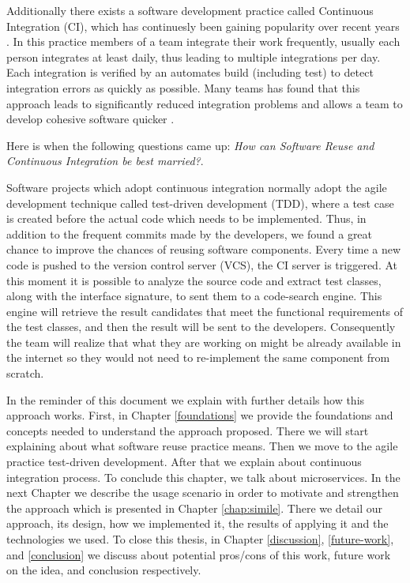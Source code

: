 Additionally there exists a software development practice called Continuous Integration (CI), which has continuesly been gaining popularity over recent years \cite{Perforce2015}. In this practice members of a team integrate their work frequently, usually each person integrates at least daily, thus leading to multiple integrations per day. Each integration is verified by an automates build (including test) to detect integration errors as quickly as possible. Many teams has found that this approach leads to significantly reduced integration problems and allows a team to develop cohesive software quicker \cite{Fowler2006}.

Here is when the following questions came up: \emph{How can Software Reuse and Continuous Integration be best married?}.

Software projects which adopt continuous integration normally adopt the agile development technique called test-driven development (TDD), where a test case is created before the actual code which needs to be implemented. Thus, in addition to the frequent commits made by the developers, we found a great chance to improve the chances of reusing software components. Every time a new code is pushed to the version control server (VCS), the CI server is triggered. At this moment it is possible to analyze the source code and extract test classes, along with the interface signature, to sent them to a code-search engine. This engine will retrieve the result candidates that meet the functional requirements of the test classes, and then the result will be sent to the developers. Consequently the team will realize that what they are working on might be already available in the internet so they would not need to re-implement the same component from scratch.

In the reminder of this document we explain with further details how this approach works. First, in Chapter \ref{foundations} we provide the foundations and concepts needed to understand the approach proposed. There we will start explaining about what software reuse practice means. Then we move to the agile practice test-driven development. After that we explain about continuous integration process. To conclude this chapter, we talk about microservices. In the next Chapter we describe the usage scenario in order to motivate and strengthen the approach which is presented in Chapter \ref{chap:simile}. There we detail our approach, its design, how we implemented it, the results of applying it and the technologies we used. To close this thesis, in Chapter \ref{discussion}, \ref{future-work}, and \ref{conclusion} we discuss about potential pros/cons of this work, future work on the idea, and conclusion respectively.




